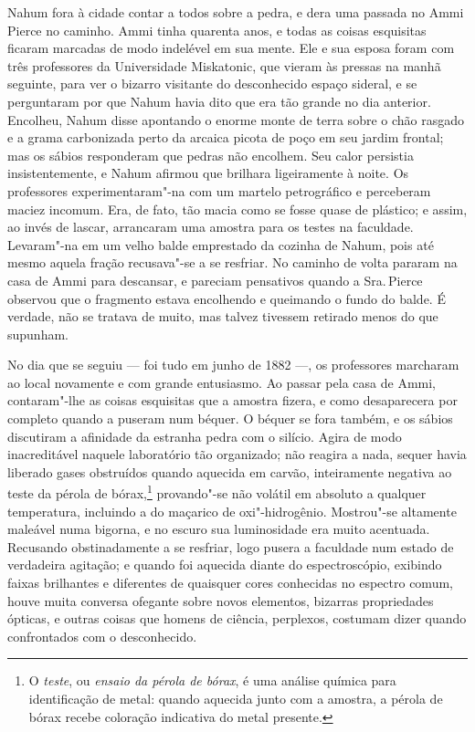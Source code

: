 Nahum fora à cidade contar a todos sobre a pedra, e dera uma passada no
Ammi Pierce no caminho. Ammi tinha quarenta anos, e todas as coisas
esquisitas ficaram marcadas de modo indelével em sua mente. Ele e sua
esposa foram com três professores da Universidade Miskatonic, que vieram
às pressas na manhã seguinte, para ver o bizarro visitante do
desconhecido espaço sideral, e se perguntaram por que Nahum havia dito
que era tão grande no dia anterior. Encolheu, Nahum disse apontando o
enorme monte de terra sobre o chão rasgado e a grama carbonizada perto
da arcaica picota de poço em seu jardim frontal; mas os sábios
responderam que pedras não encolhem. Seu calor persistia
insistentemente, e Nahum afirmou que brilhara ligeiramente à noite. Os
professores experimentaram"-na com um martelo petrográfico e perceberam
maciez incomum. Era, de fato, tão macia como se fosse quase de plástico;
e assim, ao invés de lascar, arrancaram uma amostra para os testes na
faculdade. Levaram"-na em um velho balde emprestado da cozinha de Nahum,
pois até mesmo aquela fração recusava"-se a se resfriar. No caminho de
volta pararam na casa de Ammi para descansar, e pareciam pensativos
quando a Sra.\,Pierce observou que o fragmento estava encolhendo e
queimando o fundo do balde. É verdade, não se tratava de muito, mas
talvez tivessem retirado menos do que supunham.

No dia que se seguiu --- foi tudo em junho de 1882 ---, os professores
marcharam ao local novamente e com grande entusiasmo. Ao passar pela
casa de Ammi, contaram"-lhe as coisas esquisitas que a amostra fizera, e
como desaparecera por completo quando a puseram num béquer. O béquer se
fora também, e os sábios discutiram a afinidade da estranha pedra com o
silício. Agira de modo inacreditável naquele laboratório tão organizado;
não reagira a nada, sequer havia liberado gases obstruídos quando
aquecida em carvão, inteiramente negativa ao teste da pérola de
bórax,\footnote{O \textit{teste}, ou \textit{ensaio da pérola de bórax}, é uma
  análise química para identificação de metal: quando aquecida junto com
  a amostra, a pérola de bórax recebe coloração indicativa do metal
  presente.} provando"-se não volátil em absoluto a qualquer
temperatura, incluindo a do maçarico de oxi"-hidrogênio. Mostrou"-se
altamente maleável numa bigorna, e no escuro sua luminosidade era muito
acentuada. Recusando obstinadamente a se resfriar, logo pusera a
faculdade num estado de verdadeira agitação; e quando foi aquecida
diante do espectroscópio, exibindo faixas brilhantes e diferentes de
quaisquer cores conhecidas no espectro comum, houve muita conversa
ofegante sobre novos elementos, bizarras propriedades ópticas, e outras
coisas que homens de ciência, perplexos, costumam dizer quando
confrontados com o desconhecido.

